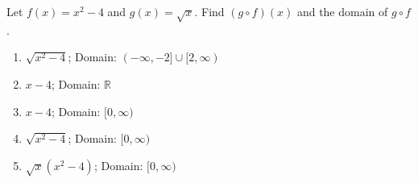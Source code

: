 
\bigskip

\item Let $f(x) = x^2 - 4$ and $g(x) = \sqrt{x}$.  Find $(g \circ f)(x)$ and the domain of $g \circ f$.
	
	\begin{enumerate}
		\item $\sqrt{x^2 - 4}$; Domain: $(-\infty,-2] \cup [2,\infty)$
		\item $x - 4$; Domain: $\mathbb{R}$
		\item $x - 4$; Domain: $[0,\infty)$
		\item $\sqrt{x^2 - 4}$; Domain: $[0,\infty)$
		\item $\sqrt{x}(x^2 - 4)$; Domain: $[0,\infty)$
	\end{enumerate}
	

